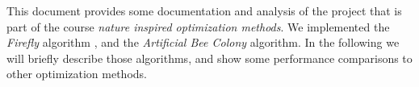 This document provides some documentation and analysis of the project that is
part of the course \textit{nature inspired optimization methods}. We
implemented the \textit{Firefly} algorithm \cite{firefly}, and the
\textit{Artificial Bee Colony} \cite{beecolony} algorithm. In the following we
will briefly describe those algorithms, and show some performance comparisons
to other optimization methods.

